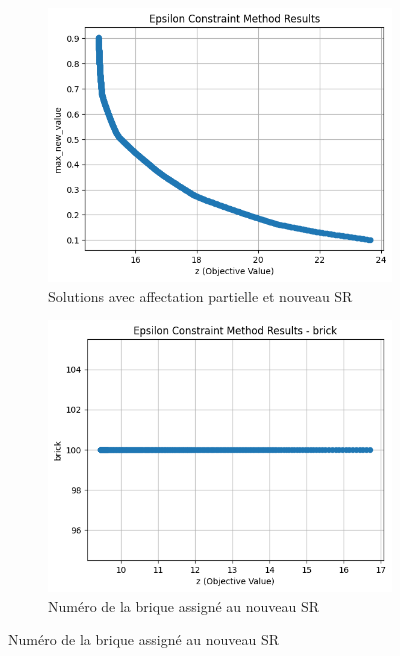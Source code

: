 \begin{itemize}
    \begin{figure}[H]
        \centering
        \begin{subfigure}[b]{0.48\textwidth}
            \centering
            \includegraphics[width=\textwidth]{Images/step_2/step_2-pareto_front.png}
            \caption{Solutions avec affectation partielle et nouveau SR}
        \end{subfigure}
        \hfill
        \begin{subfigure}[b]{0.48\textwidth}
            \centering
            \includegraphics[width=\textwidth]{Images/step_2/step_2-pareto_front2.png}
            \caption{Numéro de la brique assigné au nouveau SR}
        \end{subfigure}
        

\end{figure}
\end{itemize}
